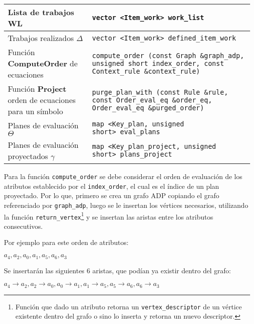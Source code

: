 \begin{tabular}{| p{4.5cm} | p{10.5cm} |}
\hline
Lista de trabajos \textbf{WL} & \texttt{vector <Item\_work>\ work\_list} \\ \hline

Trabajos realizados {\LARGE\textbf{$\Delta$}} & \texttt{vector <Item\_work>\ defined\_item\_work} \\ \hline

Función \textbf{ComputeOrder} de ecuaciones & \texttt{compute\_order (const Graph \&graph\_adp, unsigned short index\_order, const Context\_rule \&context\_rule)} \\ \hline

Función \textbf{Project} orden de ecuaciones para un símbolo & \texttt{purge\_plan\_with (const Rule \&rule, const Order\_eval\_eq \&order\_eq, Order\_eval\_eq \&purged\_order)} \\ \hline

Planes de evaluación {\LARGE\textbf{$\Theta$}} & \texttt{map <Key\_plan, unsigned short>\ eval\_plans} \\ \hline

Planes de evaluación \hspace{1cm}proyectados {\LARGE\textbf{$\gamma$}} & \texttt{map <Key\_plan\_project, unsigned short>\ plans\_project} \\
\hline
\end{tabular}
\vspace{0.3cm}

Para la función \texttt{compute\_order} se debe considerar el orden de evaluación de los atributos establecido por el \texttt{index\_order}, el cual es el índice de un plan proyectado. Por lo que, primero se crea un grafo ADP copiando el grafo referenciado por \texttt{graph\_adp}, luego se le insertan los vértices necesarios, utilizando la función \texttt{return\_vertex}\footnote{Función que dado un atributo retorna un \texttt{vertex\_descriptor} de un vértice existente dentro del grafo o sino lo inserta y retorna un nuevo descriptor.} y se insertan las aristas entre los atributos consecutivos.

Por ejemplo para este orden de atributos:
\vspace{0.1cm}
\begin{center}
\LARGE\textbf{$a_{4}, a_{2}, a_{0}, a_{1}, a_{5}, a_{6}, a_{3}$}
\end{center}
\vspace{0.2cm}
Se insertarán las siguientes 6 aristas, que podían ya existir dentro del grafo:
\vspace{0.1cm}
\begin{center}
\LARGE\textbf{$a_{4} \rightarrow a_{2}, a_{2} \rightarrow a_{0}, a_{0} \rightarrow a_{1}, a_{1} \rightarrow a_{5}, a_{5} \rightarrow a_{6}, a_{6} \rightarrow a_{3}$}
\end{center}
\vspace{0.2cm}


